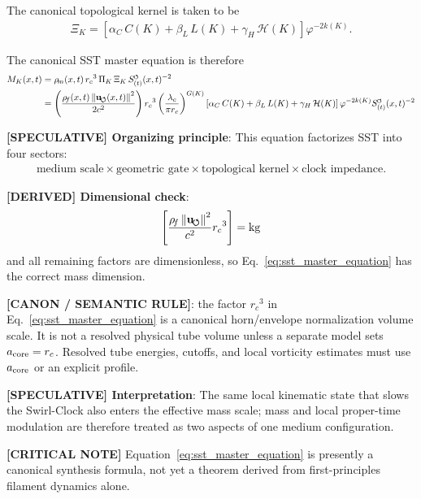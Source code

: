 \documentclass[11pt]{article}
\theoremstyle{definition}
\theoremstyle{plain}
\theoremstyle{remark}
\newcommand{\swirlarrow}{\mathchoice{\mkern-2mu\scriptstyle\boldsymbol{\circlearrowleft}}{\mkern-2mu\scriptstyle\boldsymbol{\circlearrowleft}}{\mkern-2mu\scriptscriptstyle\boldsymbol{\circlearrowleft}}{\mkern-2mu\scriptscriptstyle\boldsymbol{\circlearrowleft}}}
\newcommand{\rhoF}{{\rho_{\!f}}}
\newcommand{\rhoM}{\rho_{\!m}}
\newcommand{\SwirlClock}{{S_{(t)}^{\swirlarrow}}}
\newcommand{\rc}{{r_c}}
\newcommand{\uswirl}{\mathbf{u}_{\!\boldsymbol{\circlearrowleft}}}
\begin{document}
        The canonical topological kernel is taken to be
        \begin{align}
            \Xi_K = \left[ \alpha_C\,C(K) + \beta_L\,L(K) + \gamma_H\,\mathcal{H}(K) \right] \varphi^{-2k(K)} .
        \end{align}

        The canonical SST master equation is therefore
        \begin{align}
            M_K(x,t)
            &= \rhoM(x,t)\,\rc^3\,\Pi_K\,\Xi_K\,\SwirlClock(x,t)^{-2} \\
            &= \left( \frac{\rhoF(x,t)\,\norm{\uswirl(x,t)}^2}{2c^2} \right)
               \rc^3
               \left( \frac{\lambda_c}{\pi \rc} \right)^{G(K)}
               \left[ \alpha_C\,C(K) + \beta_L\,L(K) + \gamma_H\,\mathcal{H}(K) \right]
               \varphi^{-2k(K)}
               \SwirlClock(x,t)^{-2}
            \label{eq:sst_master_equation}
        \end{align}

        \textbf{[SPECULATIVE] Organizing principle}: This equation factorizes SST into four sectors:
        \begin{align}
            \text{medium scale} \times \text{geometric gate} \times \text{topological kernel} \times \text{clock impedance} .
        \end{align}

        \textbf{[DERIVED] Dimensional check}:
        \begin{align}
            \left[ \frac{\rhoF\,\norm{\uswirl}^2}{c^2} \rc^3 \right] = \mathrm{kg}
        \end{align}
        and all remaining factors are dimensionless, so Eq.~\ref{eq:sst_master_equation} has the correct mass dimension.

        \textbf{[CANON / SEMANTIC RULE]}: the factor \(\rc^3\) in Eq.~\eqref{eq:sst_master_equation} is a canonical horn/envelope normalization volume scale. It is not a resolved physical tube volume unless a separate model sets \(a_{\rm core}=\rc\). Resolved tube energies, cutoffs, and local vorticity estimates must use \(a_{\rm core}\) or an explicit profile.

        \textbf{[SPECULATIVE] Interpretation}: The same local kinematic state that slows the Swirl-Clock also enters the effective mass scale; mass and local proper-time modulation are therefore treated as two aspects of one medium configuration.

        \textbf{[CRITICAL NOTE]} Equation~\eqref{eq:sst_master_equation} is presently a canonical synthesis formula, not yet a theorem derived from first-principles filament dynamics alone.
\end{document}
